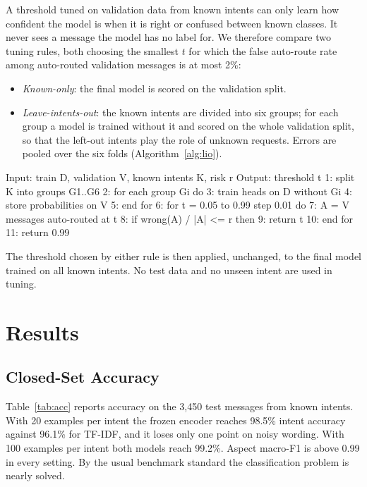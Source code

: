 \documentclass{icaiit2027}
\begin{document}
A threshold tuned on validation data from known intents can only learn how confident the model is when it is right or confused between known classes. It never sees a message the model has no label for. We therefore compare two tuning rules, both choosing the smallest $t$ for which the false auto-route rate among auto-routed validation messages is at most 2\%:

\begin{itemize}
  \item \emph{Known-only}: the final model is scored on the validation split.
  \item \emph{Leave-intents-out}: the known intents are divided into six groups; for each group a model is trained without it and scored on the whole validation split, so that the left-out intents play the role of unknown requests. Errors are pooled over the six folds (Algorithm~\ref{alg:lio}).
\end{itemize}

\begin{algorithm}[t]
\begin{algobody}
Input:  train D, validation V,
\ind\ind known intents K, risk r
Output: threshold t
1: split K into groups G1..G6
2: for each group Gi do
3: \ind train heads on D without Gi
4: \ind store probabilities on V
5: end for
6: for t = 0.05 to 0.99 step 0.01 do
7: \ind A = V messages auto-routed at t
8: \ind if wrong(A) / |A| <= r then
9: \ind\ind return t
10: end for
11: return 0.99
\end{algobody}
\caption{Leave-intents-out threshold tuning.}
\label{alg:lio}
\end{algorithm}

The threshold chosen by either rule is then applied, unchanged, to the final model trained on all known intents. No test data and no unseen intent are used in tuning.

\section{Results}

\subsection{Closed-Set Accuracy}

Table~\ref{tab:acc} reports accuracy on the 3,450 test messages from known intents. With 20 examples per intent the frozen encoder reaches 98.5\% intent accuracy against 96.1\% for TF-IDF, and it loses only one point on noisy wording. With 100 examples per intent both models reach 99.2\%. Aspect macro-F1 is above 0.99 in every setting. By the usual benchmark standard the classification problem is nearly solved.
\end{document}
